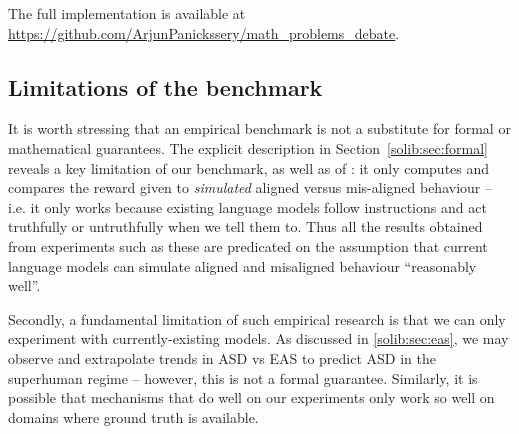 The full implementation is available at \url{https://github.com/ArjunPanickssery/math_problems_debate}.

\subsection{Limitations of the benchmark}

It is worth stressing that an empirical benchmark is not a substitute for formal or mathematical guarantees. The explicit description in Section~\ref{solib:sec:formal} reveals a key limitation of our benchmark, as well as of \previouswork{}: it only computes and compares the reward given to \emph{simulated} aligned versus mis-aligned behaviour -- i.e. it only works because existing language models follow instructions and act truthfully or untruthfully when we tell them to. Thus all the results obtained from experiments such as these are predicated on the assumption that current language models can simulate aligned and misaligned behaviour ``reasonably well''.%

Secondly, a fundamental limitation of such empirical research is that we can only experiment with currently-existing models. As discussed in \cref{solib:sec:eas}, we may observe and extrapolate trends in ASD vs EAS to predict ASD in the superhuman regime -- however, this is not a formal guarantee. Similarly, it is possible that mechanisms that do well on our experiments only work so well on domains where ground truth is available.





